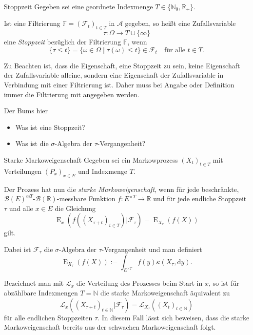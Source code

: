 \begin{defi}{Stoppzeit}
    Gegeben sei eine geordnete Indexmenge $T \in \{\mathbb{N}_0, \mathbb{R}_+ \}$.

    Ist eine Filtrierung $\mathbb{F} = ({\mathcal{F}}_{t})_{t\in T}$ in $\mathcal{A}$ gegeben, so heißt eine Zufallsvariable
    \[
        \tau : \Omega \to T \cup \{\infty \}
    \]
    eine \emph{Stoppzeit} bezüglich der Filtrierung $\mathbb{F}$, wenn
    \[
        \{\tau \leq t \} = \{\omega \in \Omega \mid \tau(\omega) \leq t \} \in \mathcal{F}_t \quad \text{für alle } t \in T.
    \]

    Zu Beachten ist, dass die Eigenschaft, eine Stoppzeit zu sein, keine Eigenschaft der Zufallsvariable alleine, sondern eine Eigenschaft der Zufallsvariable in Verbindung mit einer Filtrierung ist.
    Daher muss bei Angabe oder Definition immer die Filtrierung mit angegeben werden.
\end{defi}

\begin{info}{Der Bums hier}
    \begin{itemize}
        \item Was ist eine Stoppzeit?
        \item Was ist die $\sigma$-Algebra der $\tau$-Vergangenheit?
    \end{itemize}
\end{info}

\begin{defi}{Starke Markoweigenschaft}
    Gegeben sei ein Markowprozess $(X_{t})_{t\in T}$ mit Verteilungen $(P_{x})_{x\in E}$ und Indexmenge $T$.

    Der Prozess hat nun die \emph{starke Markoweigenschaft}, wenn für jede beschränkte, $\mathcal{B}(E)^{\otimes T}$-$\mathcal{B}(\mathbb{R})$-messbare Funktion $f : E^{\times T}\to \mathbb{R}$ und für jede endliche Stoppzeit $\tau$ und alle $x\in E$ die Gleichung
    \[
        \operatorname{E}_{x}(f((X_{\tau +t})_{t\in T})|{\mathcal{F}}_{\tau})=\operatorname{E}_{X_{\tau}}(f(X))
    \]
    gilt.

    Dabei ist $\mathcal{F}_{\tau}$ die $\sigma$-Algebra der $\tau$-Vergangenheit und man definiert
    \[
        \operatorname{E}_{X_{\tau}}(f(X)):=\int_{E^{\times T}}f(y)\kappa (X_{\tau},\mathrm{d} y).
    \]

    Bezeichnet man mit $\mathcal{L}_{x}$ die Verteilung des Prozesses beim Start in $x$, so ist für abzählbare Indexmengen $T=\mathbb{N}$ die starke Markoweigenschaft äquivalent zu
    \[
        \mathcal{L}_{x}((X_{\tau +t})_{t\in \mathbb{N}}|{\mathcal{F}}_{\tau})={\mathcal{L}}_{X_{\tau}}((X_{t})_{t\in \mathbb{N}})
    \]
    für alle endlichen Stoppzeiten $\tau$.
    In diesem Fall lässt sich beweisen, dass die starke Markoweigenschaft bereits aus der schwachen Markoweigenschaft folgt.
\end{defi}


